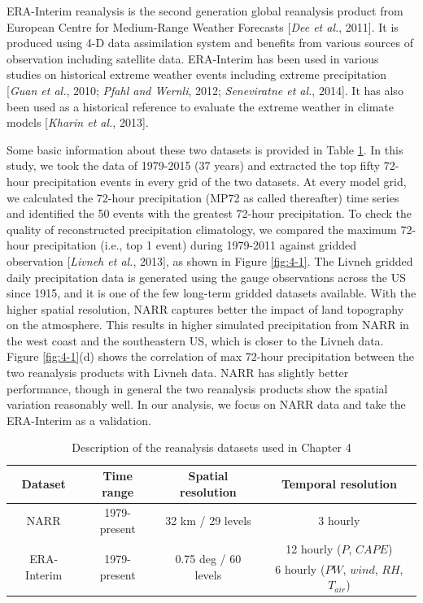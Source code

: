 ERA-Interim reanalysis is the second generation global reanalysis product from European Centre for Medium-Range Weather Forecasts [\textit{Dee et al.}, 2011]. It is produced using 4-D data assimilation system and benefits from various sources of observation including satellite data. ERA-Interim has been used in various studies on historical extreme weather events including extreme precipitation [\textit{Guan et al.}, 2010; \textit{Pfahl and Wernli}, 2012; \textit{Seneviratne et al.}, 2014]. It has also been used as a historical reference to evaluate the extreme weather in climate models [\textit{Kharin et al.}, 2013].

Some basic information about these two datasets is provided in Table \ref{table:4-1}. In this study, we took the data of 1979-2015 (37 years) and extracted the top fifty 72-hour precipitation events in every grid of the two datasets. At every model grid, we calculated the 72-hour precipitation (MP72 as called thereafter) time series and identified the 50 events with the greatest 72-hour precipitation. To check the quality of reconstructed precipitation climatology, we compared the maximum 72-hour precipitation (i.e., top 1 event) during 1979-2011 against gridded observation [\textit{Livneh et al.}, 2013], as shown in Figure \ref{fig:4-1}. The Livneh gridded daily precipitation data is generated using the gauge observations across the US since 1915, and it is one of the few long-term gridded datasets available. With the higher spatial resolution, NARR captures better the impact of land topography on the atmosphere. This results in higher simulated precipitation from NARR in the west coast and the southeastern US, which is closer to the Livneh data. Figure \ref{fig:4-1}(d) shows the correlation of max 72-hour precipitation between the two reanalysis products with Livneh data. NARR has slightly better performance, though in general the two reanalysis products show the spatial variation reasonably well. In our analysis, we focus on NARR data and take the ERA-Interim as a validation.

\begin{table}[htbp]
	\centering
	\caption{Description of the reanalysis datasets used in Chapter 4}
	\begin{tabular}{cccc}
		\hline
		Dataset & Time range & Spatial resolution & Temporal resolution\\
		\hline
		NARR  & 1979-present  & 32 km / 29 levels  & 3 hourly\\
		\hline
		\multirow{2}{*}{ERA-Interim} & \multirow{2}{*}{1979-present}  & \multirow{2}{*}{0.75 deg / 60 levels}  & 12 hourly ($P$, $CAPE$)\\
		& & & 6 hourly ($PW$, $wind$, $RH$, $T_{air}$)\\
		\hline
	\end{tabular}
	\label{table:4-1}
\end{table}

